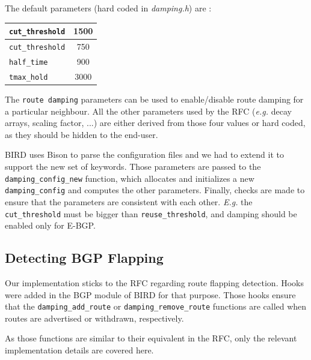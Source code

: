 \documentclass[a4paper,english]{IEEEtran}
\begin{document}
The default parameters (hard coded in \textsl{damping.h}) are :

\begin{center}
\begin{tabular}{|l|c|}
\hline
\texttt{\small cut\_threshold} & 1500 \\
\hline
\texttt{\small cut\_threshold} & 750 \\
\hline
\texttt{\small half\_time} & 900 \\
\hline
\texttt{\small tmax\_hold} & 3000 \\
\hline
\end{tabular}
\end{center}

The {\tt\small route damping} parameters can be used to enable/disable
route damping for a particular neighbour. All the other parameters used by
the RFC (\textit{e.g.} decay arrays, scaling factor, ...) are either derived from
those four values or hard coded, as they should be hidden to the end-user.

BIRD uses Bison to parse the configuration files and we had to extend it 
to support the new set of keywords. Those parameters are passed to the 
{\tt\small damping\_config\_new} function, which allocates and initializes 
a new {\tt\small damping\_config} and computes the other parameters.
Finally, checks are made to ensure that the parameters are consistent with 
each other. \textit{E.g.} the \texttt{\small cut\_threshold} must be bigger
than \texttt{\small reuse\_threshold}, and damping should be enabled only for E-BGP.

\subsection{Detecting BGP Flapping}

Our implementation sticks to the RFC regarding route flapping detection.
Hooks were added in the BGP module of BIRD for that purpose.
Those hooks ensure that the {\tt\small damping\_add\_route} or 
{\tt\small damping\_remove\_route} functions are 
called when routes are advertised or withdrawn, respectively.

As those functions are similar to their equivalent in the RFC, only the relevant
implementation details are covered here.
\end{document}

